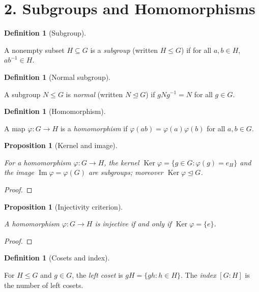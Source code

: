 \documentclass[11pt,letterpaper]{article}
\newtheorem{proposition}[theorem]{Proposition}
\theoremstyle{definition}
\newtheorem{definition}[theorem]{Definition}
\theoremstyle{remark}
\newcommand{\Ker}{\operatorname{Ker}}
\newcommand{\Img}{\operatorname{Im}}
\newcommand{\uses}[1]{}
\begin{document}
\section*{2. Subgroups and Homomorphisms}

\begin{definition}[Subgroup]\label{def:subgroup}
\uses{def:group}
A nonempty subset $H\subseteq G$ is a \emph{subgroup} (written $H\le G$) if for all $a,b\in H$, $ab^{-1}\in H$.
\end{definition}

\begin{definition}[Normal subgroup]\label{def:normal_subgroup}
\uses{def:group,def:subgroup}
A subgroup $N\le G$ is \emph{normal} (written $N\trianglelefteq G$) if $gNg^{-1}=N$ for all $g\in G$.
\end{definition}

\begin{definition}[Homomorphism]\label{def:homomorphism}
\uses{def:group}
A map $\varphi:G\to H$ is a \emph{homomorphism} if $\varphi(ab)=\varphi(a)\varphi(b)$ for all $a,b\in G$.
\end{definition}

\begin{proposition}[Kernel and image]\label{prop:kernel_image}
\uses{def:group,def:subgroup,def:normal_subgroup,def:homomorphism}
For a homomorphism $\varphi:G\to H$, the kernel $\Ker\varphi=\{g\in G:\varphi(g)=e_H\}$ and the image $\Img\varphi=\varphi(G)$ are subgroups; moreover $\Ker\varphi\trianglelefteq G$.
\end{proposition}
\begin{proof}\end{proof}

\begin{proposition}[Injectivity criterion]\label{prop:injective_kernel}
\uses{def:group,def:subgroup,def:homomorphism}
A homomorphism $\varphi:G\to H$ is injective if and only if $\Ker\varphi=\{e\}$.
\end{proposition}
\begin{proof}\uses{prop:kernel_image}\end{proof}

\begin{definition}[Cosets and index]\label{def:coset_index}
\uses{def:group,def:subgroup}
For $H\le G$ and $g\in G$, the \emph{left coset} is $gH=\{gh:h\in H\}$. The \emph{index} $[G:H]$ is the number of left cosets.
\end{definition}
\end{document}
